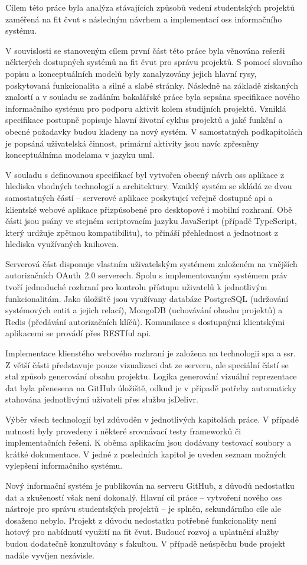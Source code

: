 Cílem této práce byla analýza stávajících způsobů vedení studentských projektů zaměřená na \gls{fit} \gls{čvut} s následným návrhem a implementací \gls{oss} informačního systému.

V souvislosti se stanoveným cílem první část této práce byla věnována rešerši některých dostupných systémů na \gls{fit} \gls{čvut} pro správu projektů. S pomocí slovního popisu a konceptuálních modelů byly zanalyzovány jejich hlavní rysy, poskytovaná funkcionalita a silné a slabé stránky. Následně na základě získaných znalostí a v souladu se zadáním bakalářské práce byla sepsána specifikace nového informačního systému pro podporu aktivit kolem studijních projektů. Vzniklá specifikace postupně popisuje hlavní životní cyklus projektů a jaké funkční a obecné požadavky budou kladeny na nový systém. V samostatných podkapitolách je popsáná uživatelská činnost, primární aktivity jsou navíc zpřesněny konceptuálníma modelama v jazyku \gls{uml}.

V souladu s definovanou specifikací byl vytvořen obecný návrh \gls{oss} aplikace z hlediska vhodných technologií a architektury. Vzniklý systém se skládá ze dvou samostatných částí -- serverové aplikace poskytujcí veřejně dostupné \gls{api} a klientské webové aplikace přizpůsobené pro desktopové i mobilní rozhraní. Obě části jsou psány ve stejném scriptovacím jazyku JavaScript (případě TypeScript, který urdžuje zpětnou kompatibilitu), to přináší přehlednost a jednotnost z hlediska využívaných knihoven. 

Serverová část disponuje vlastním uživatelským systémem založeném na vnějších autorizačních OAuth~2.0 serverech. Spolu s implementovaným systémem práv tvoří jednoduché rozhraní pro kontrolu přístupu uživatelů k jednotlivým funkcionalitám. Jako úložiště jsou využívany databáze PostgreSQL (udržování systémových entit a jejich relací), MongoDB (uchovávání obashu projektů) a Redis (předávání autorizačních klíčů). Komunikace s dostupnými klientskými aplikacemi se provádí přes RESTful \gls{api}.

Implementace klienstého webového rozhraní je založena na technologii \gls{spa} a \gls{ssr}. Z větší části představuje pouze vizualizaci dat ze serveru, ale speciální částí se stal způsob generování obsahu projektu. Logika generování vizuální reprezentace dat byla přenesena na GitHub úložiště, odkud je v případě potřeby automaticky stahována jednotlivými uživateli přes službu jsDelivr. 

Výběr všech technologií byl zdůvoděn v jednotlivých kapitolách práce. V případě nutnosti byly provedeny i některé srovnávací testy frameworků či implementačních řešení. K oběma aplikacím jsou dodávany testovací soubory a krátké dokumentace. V jedné z posledních kapitol je uveden seznam možných vylepšení informačního systému.

Nový informační systém je publikován na serveru GitHub, z důvodů nedostatku dat a zkušeností však není dokonalý. Hlavní cíl práce -- vytvoření nového \gls{oss} nástroje pro správu studentských projektů -- je splněn, sekundárního cíle ale dosaženo nebylo. Projekt z důvodu nedostatku potřebné funkcionality není hotový pro nabídnutí využití na \gls{fit} \gls{čvut}. Budoucí rozvoj a uplatnění služby budou dodatečně konzultovány s fakultou. V případě neúspěchu bude projekt nadále vyvíjen nezávisle.